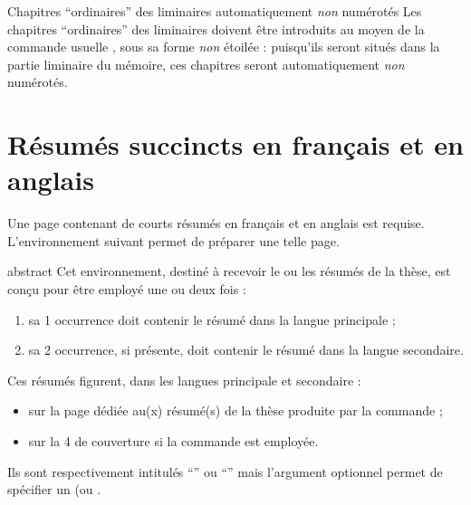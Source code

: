 \begin{dbwarning}{Chapitres \enquote{ordinaires} des \glspl{liminaire}
    automatiquement \emph{non} numérotés}{}
  Les chapitres \enquote{ordinaires} des \glspl{liminaire} doivent être
  introduits au moyen de la commande usuelle , sous sa
  forme \emph{non} étoilée : puisqu'ils seront situés dans la partie liminaire
  du mémoire, ces chapitres seront automatiquement \emph{non} numérotés.
\end{dbwarning}


\section{Résumés succincts en français et en anglais}\label{sec-abstract}

Une page contenant de courts résumés en français et en anglais est requise.
L'environnement  suivant permet de préparer une telle
page.
%
\begin{docEnvironment}[doclang/environment content=résumé,doc description=\mandatory]{abstract}{}
  Cet environnement, destiné à recevoir le ou les résumés de la thèse, est
  conçu pour être employé une ou deux fois :
  \begin{enumerate}
  \item sa 1\iere{} occurrence doit contenir le résumé dans la langue
    principale ;
  \item sa 2\ieme{} occurrence, si présente, doit contenir le résumé dans la
    langue secondaire.
  \end{enumerate}
  Ces résumés figurent, dans les langues principale et secondaire :
  \begin{itemize}
  \item sur la page dédiée au(x) résumé(s) de la thèse produite par la commande
     ;
  \item sur la 4\ieme{} de couverture si la commande  est
    employée.
  \end{itemize}
  Ils %
  sont respectivement intitulés \enquote{\abstractname} ou
  \enquote{\abstractname}\selonlangueshort{} mais
  l'argument optionnel permet de spécifier un  (ou 
    \redefexprcle.
\end{docEnvironment}

